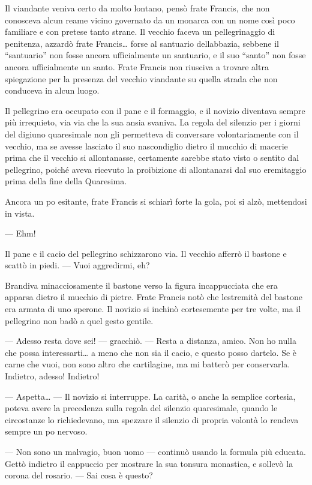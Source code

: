 Il viandante veniva certo da molto lontano, pensò frate Francis, che non
conosceva alcun reame vicino governato da un monarca con un nome così
poco familiare e con pretese tanto strane. Il vecchio faceva un
pellegrinaggio di penitenza, azzardò frate Francis\ldots{} forse al
santuario dell\textquotesingle abbazia, sebbene il ``santuario'' non
fosse ancora ufficialmente un santuario, e il suo ``santo'' non fosse
ancora ufficialmente un santo. Frate Francis non riusciva a trovare
altra spiegazione per la presenza del vecchio viandante su quella strada
che non conduceva in alcun luogo.

Il pellegrino era occupato con il pane e il formaggio, e il novizio
diventava sempre più irrequieto, via via che la sua ansia svaniva. La
regola del silenzio per i giorni del digiuno quaresimale non gli
permetteva di conversare volontariamente con il vecchio, ma se avesse
lasciato il suo nascondiglio dietro il mucchio di macerie prima che il
vecchio si allontanasse, certamente sarebbe stato visto o sentito dal
pellegrino, poiché aveva ricevuto la proibizione di allontanarsi dal suo
eremitaggio prima della fine della Quaresima.

Ancora un po\textquotesingle{} esitante, frate Francis si schiarì forte
la gola, poi si alzò, mettendosi in vista.

--- Ehm!

Il pane e il cacio del pellegrino schizzarono via. Il vecchio afferrò il
bastone e scattò in piedi. --- Vuoi aggredirmi, eh?

Brandiva minacciosamente il bastone verso la figura incappucciata che
era apparsa dietro il mucchio di pietre. Frate Francis notò che
l\textquotesingle estremità del bastone era armata di uno sperone. Il
novizio si inchinò cortesemente per tre volte, ma il pellegrino non badò
a quel gesto gentile.

--- Adesso resta dove sei! --- gracchiò. --- Resta a distanza, amico.
Non ho nulla che possa interessarti\ldots{} a meno che non sia il cacio,
e questo posso dartelo. Se è carne che vuoi, non sono altro che
cartilagine, ma mi batterò per conservarla. Indietro, adesso! Indietro!

--- Aspetta\ldots{} --- Il novizio si interruppe. La carità, o anche la
semplice cortesia, poteva avere la precedenza sulla regola del silenzio
quaresimale, quando le circostanze lo richiedevano, ma spezzare il
silenzio di propria volontà lo rendeva sempre un po\textquotesingle{}
nervoso.

--- Non sono un malvagio, buon uomo --- continuò usando la formula più
educata. Gettò indietro il cappuccio per mostrare la sua tonsura
monastica, e sollevò la corona del rosario. --- Sai cosa è questo?

